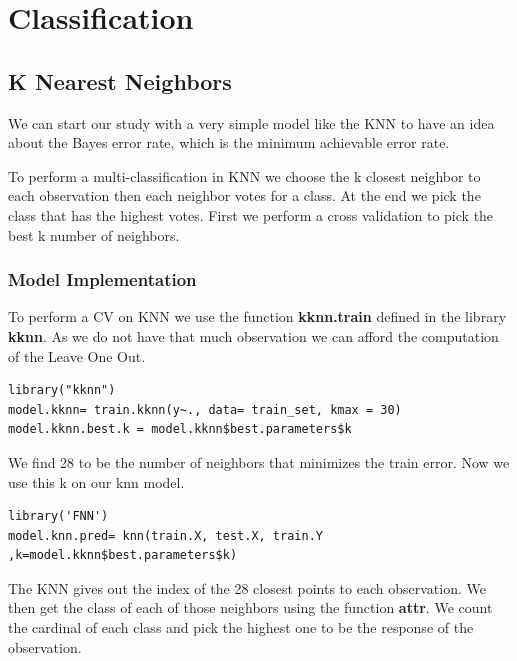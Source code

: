 \documentclass[]{report}
\begin{document}
\section{Classification}

\subsection{K Nearest Neighbors}
We can start our study with a very simple model like the KNN to have an idea about the Bayes error rate, which is the minimum achievable error rate. 

To perform a multi-classification in KNN we choose the k closest neighbor to each observation then each neighbor votes for a  class. At the end we pick the class that has the highest votes. 
First we perform a cross validation to pick the best k number of neighbors.

\subsubsection{Model Implementation}
To perform a CV on KNN we use the function \textbf{kknn.train} defined in the library \textbf{kknn}. As we do not have that much observation we can afford the computation of the Leave One Out.
\begin{lstlisting}
library("kknn")
model.kknn= train.kknn(y~., data= train_set, kmax = 30)
model.kknn.best.k = model.kknn$best.parameters$k
\end{lstlisting}
We find 28 to be the number of neighbors that minimizes the train error. Now we use this k on our knn model.

\begin{lstlisting}
library('FNN')
model.knn.pred= knn(train.X, test.X, train.Y ,k=model.kknn$best.parameters$k)
\end{lstlisting}

The KNN gives out the index of the 28 closest points to each observation. We then get the class of each of those neighbors using the function\textbf{ attr}. We count the cardinal of each class and pick the highest one to be the response of the observation.
\pagebreak
\end{document}
